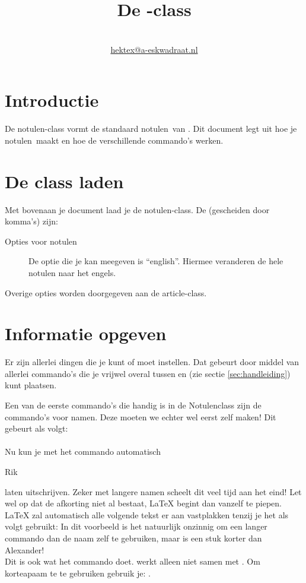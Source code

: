 \documentclass{article}
\title{De \classsf-class} %
\author{\aeskwadraat \TeXniCie\\\newcommand{\R}{\naam{Rik}}
\url{hektex@a-eskwadraat.nl}}
\newcommand\meta[1]{\placeholder[#1]}
\newcommand\bladiebla{\begin{slshape}{Rik}\end{slshape}}
\newcommand\classnaam{notulen}%
\newcommand\classsf{\textsf{\classnaam}}
\newcommand\funktie{notulen}%
\begin{document}
\maketitle


\section{Introductie}%

De \classsf-class vormt de standaard \funktie \ van \aeskwadraat.
Dit document legt uit hoe je \funktie \ maakt en hoe de verschillende commando's werken.


\section{De class laden}

Met \cmdarg[opt]{\meta{opties}}\cmdarg{\classnaam} bovenaan je document laad je de \classsf-class.
De \meta{opties} (gescheiden door komma's) zijn:

\begin{description}
\item[Opties voor \classnaam] De optie die je kan meegeven is ``english''. Hiermee veranderen de hele notulen naar het engels.
\end{description}

Overige opties worden doorgegeven aan de article-class.

\section{Informatie opgeven} %

Er zijn allerlei dingen die je kunt of moet instellen. Dat gebeurt door middel van allerlei commando's die je vrijwel overal tussen \class{\classnaam}
en  (zie sectie \ref{sec:handleiding}) kunt plaatsen.

Een van de eerste commando's die handig is in de Notulenclass zijn de commando's voor namen. Deze moeten we echter wel eerst zelf maken! Dit gebeurt als volgt: \\

   \\

Nu kun je met het commando  automatisch \bladiebla{} laten uitschrijven. Zeker met langere namen scheelt dit veel tijd aan het eind! Let wel op dat de afkorting niet al bestaat, \LaTeX{} begint dan vanzelf te piepen. \LaTeX{} zal automatisch alle volgende tekst er aan vastplakken tenzij je het als volgt gebruikt: \cmdarg{}
In dit voorbeeld is het natuurlijk onzinnig om een langer commando dan de naam zelf te gebruiken, maar \cmdarg{} is een stuk korter dan Alexander! \\
Dit is ook wat het commando  doet.  werkt alleen niet samen met . Om korteapaam te te gebruiken gebruik je: .
\end{document}
